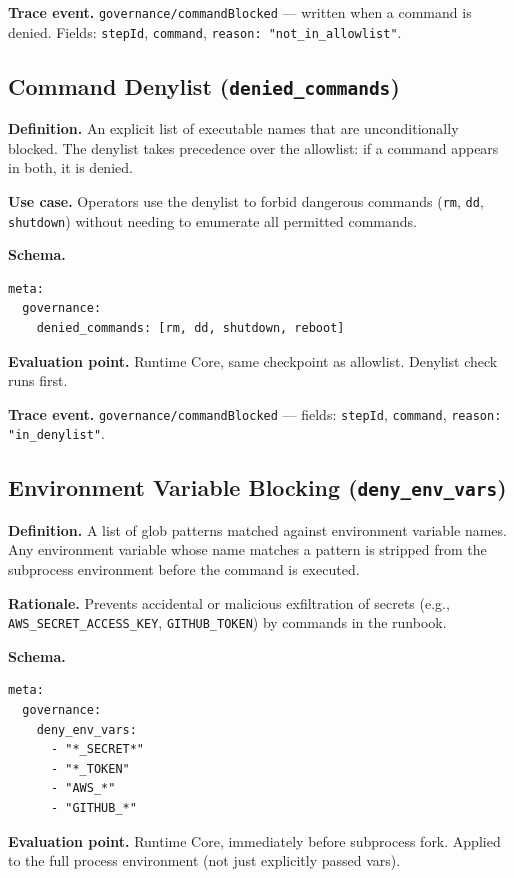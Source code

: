 \textbf{Trace event.} \texttt{governance/commandBlocked} — written when a command is denied.
Fields: \texttt{stepId}, \texttt{command}, \texttt{reason: "not\_in\_allowlist"}.

\subsection{Command Denylist (\texttt{denied\_commands})}

\textbf{Definition.} An explicit list of executable names that are unconditionally blocked.
The denylist takes precedence over the allowlist: if a command appears in both, it is denied.

\textbf{Use case.} Operators use the denylist to forbid dangerous commands (\texttt{rm},
\texttt{dd}, \texttt{shutdown}) without needing to enumerate all permitted commands.

\textbf{Schema.}
\begin{verbatim}
meta:
  governance:
    denied_commands: [rm, dd, shutdown, reboot]
\end{verbatim}

\textbf{Evaluation point.} Runtime Core, same checkpoint as allowlist. Denylist check runs
first.

\textbf{Trace event.} \texttt{governance/commandBlocked} — fields: \texttt{stepId},
\texttt{command}, \texttt{reason: "in\_denylist"}.

\subsection{Environment Variable Blocking (\texttt{deny\_env\_vars})}

\textbf{Definition.} A list of glob patterns matched against environment variable names.
Any environment variable whose name matches a pattern is stripped from the subprocess
environment before the command is executed.

\textbf{Rationale.} Prevents accidental or malicious exfiltration of secrets (e.g.,
\texttt{AWS\_SECRET\_ACCESS\_KEY}, \texttt{GITHUB\_TOKEN}) by commands in the runbook.

\textbf{Schema.}
\begin{verbatim}
meta:
  governance:
    deny_env_vars:
      - "*_SECRET*"
      - "*_TOKEN"
      - "AWS_*"
      - "GITHUB_*"
\end{verbatim}

\textbf{Evaluation point.} Runtime Core, immediately before subprocess fork. Applied to the
full process environment (not just explicitly passed vars).

